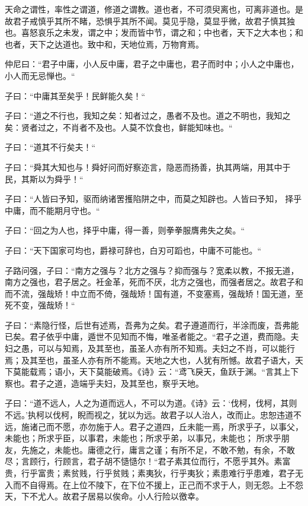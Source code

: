 \documentclass[]{article}
\begin{document}
天命之谓性，率性之谓道，修道之谓教。道也者，不可须臾离也，可离非道也。是故君子戒慎乎其所不睹，恐惧乎其所不闻。莫见乎隐，莫显乎微，故君子慎其独也。喜怒哀乐之未发，谓之中；发而皆中节，谓之和；中也者，天下之大本也；和也者，天下之达道也。致中和，天地位焉，万物育焉。

仲尼曰：``君子中庸，小人反中庸，君子之中庸也，君子而时中；小人之中庸也，小人而无忌惮也。``

子曰：``中庸其至矣乎！民鲜能久矣！``

子曰：``道之不行也，我知之矣：知者过之，愚者不及也。道之不明也，我知之矣：贤者过之，不肖者不及也。人莫不饮食也，鲜能知味也。``

子曰：``道其不行矣夫！``

子曰：``舜其大知也与！舜好问而好察迩言，隐恶而扬善，执其两端，用其中于民，其斯以为舜乎！``

子曰：``人皆曰予知，驱而纳诸罟擭陷阱之中，而莫之知辟也。人皆曰予知，
择乎中庸，而不能期月守也。``

子曰：``回之为人也，择乎中庸，得一善，则拳拳服膺弗失之矣。``

子曰：``天下国家可均也，爵禄可辞也，白刃可蹈也，中庸不可能也。``

子路问强，子曰：``南方之强与？北方之强与？抑而强与？宽柔以教，不报无道，南方之强也，君子居之。衽金革，死而不厌，北方之强也，而强者居之。故君子和而不流，强哉矫！中立而不倚，强哉矫！国有道，不变塞焉，强哉矫！国无道，至死不变，强哉矫！``

子曰：``素隐行怪，后世有述焉，吾弗为之矣。君子遵道而行，半涂而废，吾弗能已矣。君子依乎中庸，遁世不见知而不悔，唯圣者能之。``君子之道，费而隐。夫妇之愚，可以与知焉，及其至也，虽圣人亦有所不知焉。夫妇之不肖，可以能行焉；及其至也，虽圣人亦有所不能焉。天地之大也，人犹有所憾。故君子语大，天下莫能载焉；语小，天下莫能破焉。《诗》云：``鸢飞戾天，鱼跃于渊。``言其上下察也。君子之道，造端乎夫妇，及其至也，察乎天地。

子曰：``道不远人，人之为道而远人，不可以为道。《诗》云：`伐柯，伐柯，其则不远。'执柯以伐柯，睨而视之，犹以为远。故君子以人治人，改而止。忠恕违道不远，施诸己而不愿，亦勿施于人。君子之道四，丘未能一焉，所求乎子，以事父，未能也；所求乎臣，以事君，未能也；所求乎弟，以事兄，未能也；
所求乎朋友，先施之，未能也。庸德之行，庸言之谨；有所不足，不敢不勉，有余，不敢尽；言顾行，行顾言，君子胡不慥慥尔！``君子素其位而行，不愿乎其外。素富贵，行乎富贵；素贫贱，行乎贫贱；素夷狄，行乎夷狄；素患难行乎患难，君子无入而不自得焉。在上位不陵下，在下位不援上，正己而不求于人，则无怨。上不怨天，下不尤人。故君子居易以俟命。小人行险以徼幸。
\end{document}
